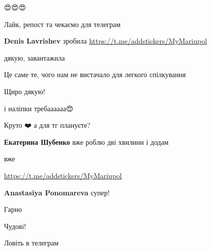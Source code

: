  
 
 
 
 

\qqSecCmt

😍😍😍

Лайк, репост та чекаємо для телеграм

\begin{itemize} %
\textbf{Denis Lavrishev} зробила \url{https://t.me/addstickers/MyMariupol}
\end{itemize} %


дякую, завантажила


Це саме те, чого нам не вистачало для легкого спілкування 🥰


Щиро дякую!


і наліпки требаааааа😍


Круто ❤️ а для тг плануєте?

\begin{itemize} %
\textbf{Екатерина Шубенко} вже роблю дві хвилини і додам


вже

\url{https://t.me/addstickers/MyMariupol}

\textbf{Anastasiya Ponomareva} супер!

\end{itemize} %


Гарно


Чудові!


Ловіть в телеграм

